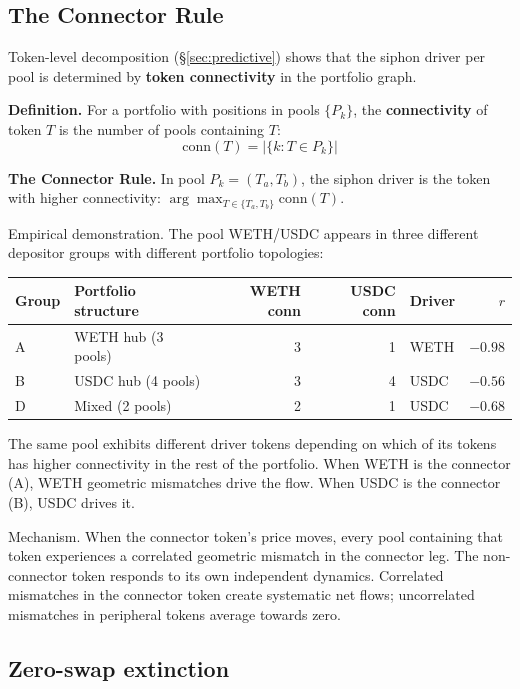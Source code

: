\documentclass[11pt,a4paper]{article}
\begin{document}
\subsection{The Connector Rule}\label{sec:connector}

Token-level decomposition (\S\ref{sec:predictive}) shows that the siphon driver per pool is determined by \textbf{token connectivity} in the portfolio graph.

\textbf{Definition.} For a portfolio with positions in pools $\{P_k\}$, the \textbf{connectivity} of token $T$ is the number of pools containing $T$:
\begin{equation}\label{eq:connectivity}
\text{conn}(T) = \left|\{k : T \in P_k\}\right|
\end{equation}

\textbf{The Connector Rule.} In pool $P_k = (T_a, T_b)$, the siphon driver is the token with higher connectivity: $\arg\max_{T \in \{T_a, T_b\}} \text{conn}(T)$.

Empirical demonstration. The pool WETH/USDC appears in three different depositor groups with different portfolio topologies:

\begin{table}[H]
\centering
\begin{tabular}{@{}llrrlr@{}}
\toprule
Group & Portfolio structure & WETH conn & USDC conn & Driver & $r$ \\
\midrule
A & WETH hub (3 pools) & 3 & 1 & WETH & $-0.98$ \\
B & USDC hub (4 pools) & 3 & 4 & USDC & $-0.56$ \\
D & Mixed (2 pools)    & 2 & 1 & USDC & $-0.68$ \\
\bottomrule
\end{tabular}
\end{table}

The same pool exhibits different driver tokens depending on which of its tokens has higher connectivity in the rest of the portfolio. When WETH is the connector (A), WETH geometric mismatches drive the flow. When USDC is the connector (B), USDC drives it.

Mechanism. When the connector token's price moves, every pool containing that token experiences a correlated geometric mismatch in the connector leg. The non-connector token responds to its own independent dynamics. Correlated mismatches in the connector token create systematic net flows; uncorrelated mismatches in peripheral tokens average towards zero.

\subsection{Zero-swap extinction}\label{sec:extinction}
\end{document}
